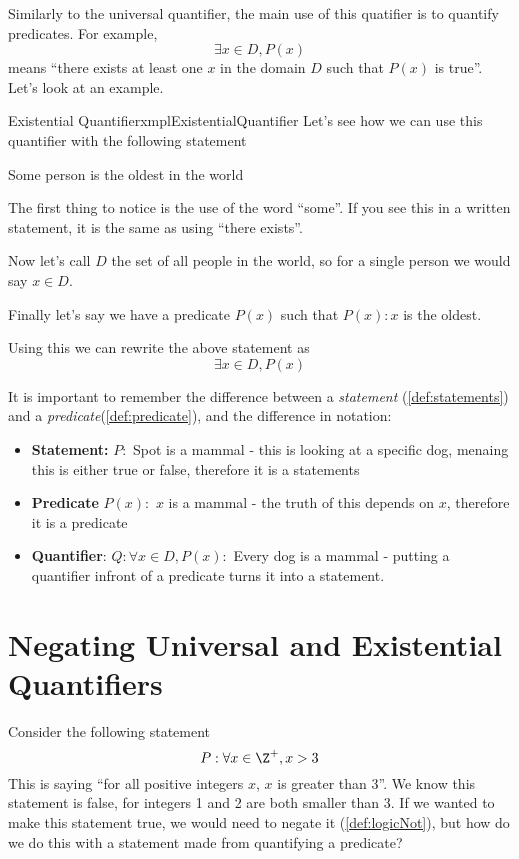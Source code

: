 Similarly to the universal quantifier, the main use of this quatifier is to quantify predicates. For example,
$$\exists x \in D, P(x)$$
means ``there exists at least one $x$ in the domain $D$ such that $P(x)$ is true''. Let's look at an example.

\begin{exmpl}[label={exmpl:existentialQuantifier}]{Existential Quantifier}{xmplExistentialQuantifier}
    Let's see how we can use this quantifier with the following statement

    \begin{center}
        Some person is the oldest in the world
    \end{center}

    The first thing to notice is the use of the word ``some''. If you see this in a written statement, it is the same as using ``there exists''.

    Now let's call $D$ the set of all people in the world, so for a single person we would say $x \in D$.

    Finally let's say we have a predicate $P(x)$ such that $P(x): x$ is the oldest.

    Using this we can rewrite the above statement as
    $$\exists x \in D, P(x)$$
\end{exmpl}

It is important to remember the difference between a \emph{statement} (\cref{def:statements}) and a \emph{predicate}(\cref{def:predicate}), and the difference in notation:
\begin{itemize}
    \item \textbf{Statement:} $P:$ Spot is a mammal - this is looking at a specific dog, menaing this is either true or false, therefore it is a statements
    \item \textbf{Predicate} $P(x):$ $x$ is a mammal - the truth of this depends on $x$, therefore it is a predicate
    \item \textbf{Quantifier}: $Q:\forall x \in D, P(x):$ Every dog is a mammal - putting a quantifier infront of a predicate turns it into a statement.
\end{itemize}

\section{Negating Universal and Existential Quantifiers}
Consider the following statement
$$P: \forall x \in \Z^+, x  > 3$$
This is saying ``for all positive integers $x$, $x$ is greater than 3''. We know this statement is false, for integers 1 and 2 are both smaller than 3. If we wanted to make this statement true, we would need to negate it (\cref{def:logicNot}), but how do we do this with a statement made from quantifying a predicate?

